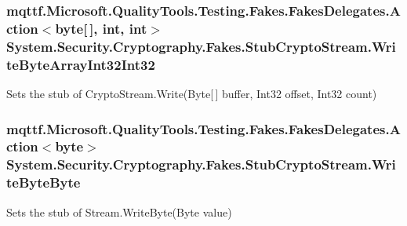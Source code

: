 \hypertarget{class_system_1_1_security_1_1_cryptography_1_1_fakes_1_1_stub_crypto_stream_a4ef84d2b5217af0fa80d88fc45680393}{
\subsubsection[{Write\-Byte\-Array\-Int32\-Int32}]{\setlength{\rightskip}{0pt plus 5cm}mqttf.\-Microsoft.\-Quality\-Tools.\-Testing.\-Fakes.\-Fakes\-Delegates.\-Action$<$byte\mbox{[}$\,$\mbox{]}, int, int$>$ System.\-Security.\-Cryptography.\-Fakes.\-Stub\-Crypto\-Stream.\-Write\-Byte\-Array\-Int32\-Int32}}\label{class_system_1_1_security_1_1_cryptography_1_1_fakes_1_1_stub_crypto_stream_a4ef84d2b5217af0fa80d88fc45680393}


Sets the stub of Crypto\-Stream.\-Write(\-Byte\mbox{[}$\,$\mbox{]} buffer, Int32 offset, Int32 count)

\hypertarget{class_system_1_1_security_1_1_cryptography_1_1_fakes_1_1_stub_crypto_stream_a3f31617ac1c97eb12f818ee8e21dd298}{
\subsubsection[{Write\-Byte\-Byte}]{\setlength{\rightskip}{0pt plus 5cm}mqttf.\-Microsoft.\-Quality\-Tools.\-Testing.\-Fakes.\-Fakes\-Delegates.\-Action$<$byte$>$ System.\-Security.\-Cryptography.\-Fakes.\-Stub\-Crypto\-Stream.\-Write\-Byte\-Byte}}\label{class_system_1_1_security_1_1_cryptography_1_1_fakes_1_1_stub_crypto_stream_a3f31617ac1c97eb12f818ee8e21dd298}


Sets the stub of Stream.\-Write\-Byte(\-Byte value)

